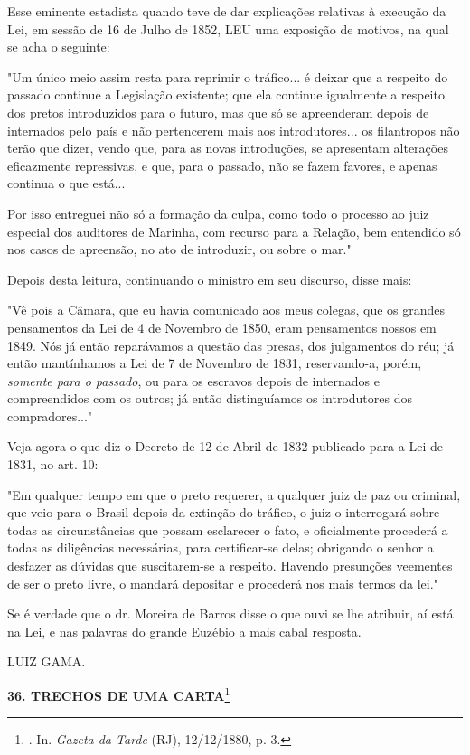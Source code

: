 Esse eminente estadista quando teve de dar explicações relativas à
execução da Lei, em sessão de 16 de Julho de 1852, LEU uma exposição de
motivos, na qual se acha o seguinte:

"Um único meio assim resta para reprimir o tráfico... é deixar que a
respeito do passado continue a Legislação existente; que ela continue
igualmente a respeito dos pretos introduzidos para o futuro, mas que só
se apreenderam depois de internados pelo país e não pertencerem mais aos
introdutores... os filantropos não terão que dizer, vendo que, para as
novas introduções, se apresentam alterações eficazmente repressivas, e
que, para o passado, não se fazem favores, e apenas continua o que
está...

Por isso entreguei não só a formação da culpa, como todo o processo ao
juiz especial dos auditores de Marinha, com recurso para a Relação, bem
entendido só nos casos de apreensão, no ato de introduzir, ou sobre o
mar."

Depois desta leitura, continuando o ministro em seu discurso, disse
mais:

"Vê pois a Câmara, que eu havia comunicado aos meus colegas, que os
grandes pensamentos da Lei de 4 de Novembro de 1850, eram pensamentos
nossos em 1849. Nós já então reparávamos a questão das presas, dos
julgamentos do réu; já então mantínhamos a Lei de 7 de Novembro de 1831,
reservando-a, porém, \emph{somente para o passado}, ou para os escravos
depois de internados e compreendidos com os outros; já então
distinguíamos os introdutores dos compradores..."

Veja agora o que diz o Decreto de 12 de Abril de 1832 publicado para a
Lei de 1831, no art. 10:

"Em qualquer tempo em que o preto requerer, a qualquer juiz de paz ou
criminal, que veio para o Brasil depois da extinção do tráfico, o juiz o
interrogará sobre todas as circunstâncias que possam esclarecer o fato,
e oficialmente procederá a todas as diligências necessárias, para
certificar-se delas; obrigando o senhor a desfazer as dúvidas que
suscitarem-se a respeito. Havendo presunções veementes de ser o preto
livre, o mandará depositar e procederá nos mais termos da lei."

Se é verdade que o dr. Moreira de Barros disse o que ouvi se lhe
atribuir, aí está na Lei, e nas palavras do grande Euzébio a mais cabal
resposta.

LUIZ GAMA.

\textbf{36. TRECHOS DE UMA CARTA}\footnote{. In. \emph{Gazeta da Tarde}
  (RJ), 12/12/1880, p. 3.}

